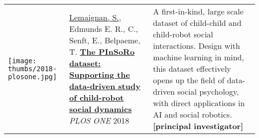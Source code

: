 {\begin{tabular}{p{1.7cm}p{7cm}p{8cm}}
    \vspace{-.20cm}\texttt{[image: thumbs/2018-plosone.jpg]} &

    \ul{Lemaignan, S.}, Edmunds E. R., C., Senft, E., Belpaeme, T.
    \newline\href{https://doi.org/10.1371/journal.pone.0205999}{\textbf{The
    PInSoRo dataset: Supporting the data-driven study of child-robot social
    dynamics}}
    \newline \textit{PLOS ONE} 2018
    & \small A first-in-kind, large scale dataset of child-child and child-robot social interactions. Design
    with machine learning in mind, this dataset effectively opens up the field
    of data-driven social psychology, with direct applications in AI and social
    robotics.\textbf{[principal investigator]}\\
\end{tabular}
}

